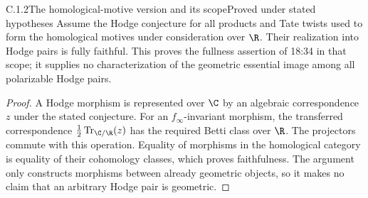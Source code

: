 \begin{result}{C.1.2}{The homological-motive version and its scope}{Proved under stated hypotheses}
Assume the Hodge conjecture for all products and Tate twists used to form the homological motives under consideration over $\R$. Their realization into Hodge pairs is fully faithful. This proves the fullness assertion of 18:34 in that scope; it supplies no characterization of the geometric essential image among all polarizable Hodge pairs.
\end{result}
\begin{proof}
A Hodge morphism is represented over $\C$ by an algebraic correspondence $z$ under the stated conjecture. For an $f_\infty$-invariant morphism, the transferred correspondence $\tfrac12\operatorname{Tr}_{\C/\R}(z)$ has the required Betti class over $\R$. The projectors commute with this operation. Equality of morphisms in the homological category is equality of their cohomology classes, which proves faithfulness. The argument only constructs morphisms between already geometric objects, so it makes no claim that an arbitrary Hodge pair is geometric.
\end{proof}

